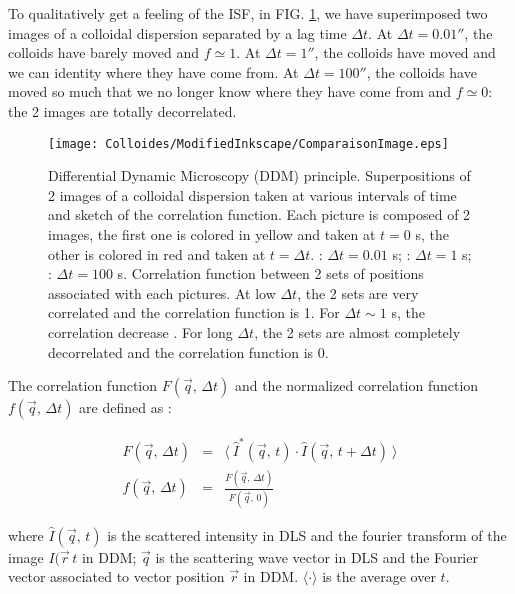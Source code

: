 \documentclass[%
 aip,
 jmp,%
 amsmath,amssymb,
reprint,%
]{revtex4-1}
\newcommand*\circled[1]{\raisebox{0.5pt}{\textcircled{\raisebox{-.9pt} {#1}}}}
\begin{document}
To qualitatively get a feeling of the ISF, in FIG. \ref{SketchCorrelation}, we have superimposed two images of a colloidal dispersion separated by a lag time $\Delta t$. At $\Delta t = \unit{0.01}{\second}$, the colloids have barely moved and $f \simeq 1$. At $\Delta t = \unit{1}{\second}$, the colloids have moved and we can identity where they have come from.  At $\Delta t = \unit{100}{\second}$, the colloids have moved so much that we no longer know where they have come from and $f \simeq 0$: the 2 images are totally decorrelated.


\begin{figure}[H]
\centering
\texttt{[image: Colloides/ModifiedInkscape/ComparaisonImage.eps]}
\caption{Differential Dynamic Microscopy (DDM) principle. Superpositions of 2 images of a colloidal dispersion taken at various intervals of time and sketch of the correlation function. Each picture is composed of 2 images, the first one is colored in yellow and taken at $t = 0$ s, the other is colored in red and taken at $t = \Delta t$. \protect\circled{1}: $\Delta t = 0.01$ s; \protect\circled{2}: $\Delta t = 1$ s; \protect\circled{3}: $\Delta t = 100$ s. Correlation function between 2 sets of positions associated with each pictures. At low $\Delta t$, the 2 sets are very correlated \protect\circled{1} and the correlation function is 1. For $\Delta t \sim 1$ s, the correlation decrease \protect\circled{2}. For long $\Delta t$, the 2 sets are almost completely decorrelated \protect\circled{3} and the correlation function is 0.}
\label{SketchCorrelation}
\end{figure}

The correlation function $F(\vec{q}, \, \Delta t)$ and the normalized correlation function $f(\vec{q}, \, \Delta t)$ are defined as \citep{19_goodman2005introduction} :

\begin{eqnarray}
F(\vec{q}, \, \Delta t) &=& \langle \ \hat{I}^*(\vec{q},\, t) \cdot \hat{I}(\vec{q},\, t+\Delta t) \ \rangle \\
f(\vec{q}, \, \Delta t) &=& \frac{F(\vec{q}, \, \Delta t)}{F(\vec{q}, \, 0)}
\end{eqnarray}

where $\hat{I}(\vec{q}, \, t)$ is the scattered intensity in DLS and the fourier transform of the image ${I(\vec{r} \, t}$ in DDM; $\vec{q}$ is the scattering wave vector in DLS and the Fourier vector associated to vector position $\vec{r}$ in DDM. $\langle \cdot \rangle$ is the average over $t$.
\end{document}
